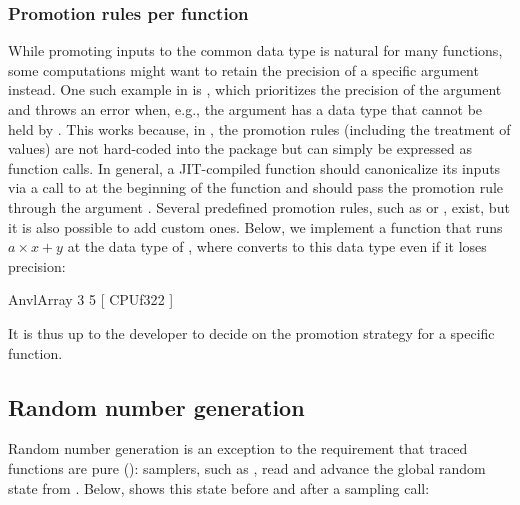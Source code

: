 \documentclass[article,shortnames]{jss}
\renewenvironment{CodeChunk}{\par\addvspace{0.6\baselineskip}\noindent\begin{minipage}{\linewidth}}{\end{minipage}\par\vspace{0.6\baselineskip}}
\begin{document}
\subsubsection{Promotion rules per function}\label{promotion}

While promoting inputs to the common data type is natural for many functions, some computations might want to retain the precision of a specific argument instead.
One such example in  is , which prioritizes the precision of the argument  and throws an error when, e.g., the argument  has a data type that cannot be held by .
This works because, in , the promotion rules (including the treatment of  values) are not hard-coded into the package but can simply be expressed as function calls.
In general, a JIT-compiled function should canonicalize its inputs via a call to  at the beginning of the function and should pass the promotion rule through the argument .
Several predefined promotion rules, such as  or , exist, but it is also possible to add custom ones.
Below, we implement a function that runs $a \times x + y$ at the data type of , where  converts  to this data type even if it loses precision:

\begin{CodeChunk}
\begin{CodeOutput}
AnvlArray
 3
 5
[ CPUf32{2} ]
\end{CodeOutput}
\end{CodeChunk}

It is thus up to the developer to decide on the promotion strategy for a specific function.

\subsection{Random number generation}\label{rng-design}

Random number generation is an exception to the requirement that traced functions are pure (): samplers, such as , read and advance the global random state from .
Below,  shows this state before and after a sampling call:
\end{document}
